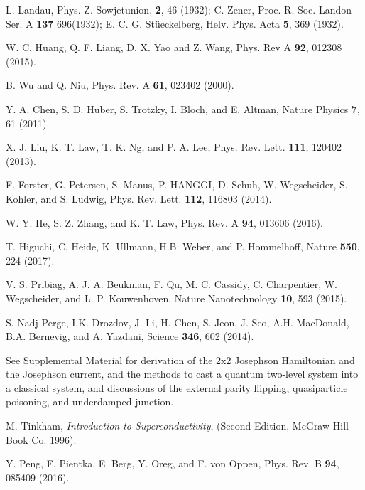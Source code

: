 \documentclass[aps,prl,twocolumn,showpacs,showpacs,10pt,superscriptaddress]{revtex4-1}
\begin{document}
\begin{thebibliography}{00}






 L. Landau, Phys. Z. Sowjetunion, \textbf{2}, 46 (1932); C. Zener, Proc. R. Soc. Landon Ser. A \textbf{137} 696(1932); E. C. G. St\"ueckelberg, Helv. Phys. Acta \textbf{5}, 369 (1932).


 W. C. Huang, Q. F. Liang, D. X. Yao and Z. Wang, Phys. Rev A \textbf{92}, 012308 (2015).

 B. Wu and Q. Niu, Phys. Rev. A \textbf{61}, 023402 (2000).

 Y. A. Chen, S. D. Huber, S. Trotzky, I. Bloch, and E. Altman, Nature Physics \textbf{7}, 61 (2011).

 X. J. Liu, K. T. Law, T. K. Ng, and P. A. Lee, Phys. Rev. Lett. \textbf{111}, 120402 (2013).

 F. Forster, G. Petersen, S. Manus, P. HANGGI, D. Schuh, W. Wegscheider, S. Kohler, and S. Ludwig, Phys. Rev. Lett. \textbf{112}, 116803 (2014).

 W. Y. He, S. Z. Zhang, and K. T. Law, Phys. Rev. A \textbf{94}, 013606 (2016).

 T. Higuchi, C. Heide, K. Ullmann, H.B. Weber, and P. Hommelhoff, Nature \textbf{550}, 224 (2017).

 V. S. Pribiag, A. J. A. Beukman, F. Qu, M. C. Cassidy, C. Charpentier, W. Wegscheider, and L. P. Kouwenhoven, Nature Nanotechnology \textbf{10}, 593 (2015).

 S. Nadj-Perge, I.K. Drozdov, J. Li, H. Chen, S. Jeon, J. Seo, A.H. MacDonald, B.A. Bernevig, and A. Yazdani, Science \textbf{346}, 602 (2014).

 See Supplemental Material for derivation of the 2x2 Josephson Hamiltonian and the Josephson current, and the methods to cast a quantum two-level system into a classical system, and discussions of the external parity flipping, quasiparticle poisoning, and underdamped junction.

  M. Tinkham, {\it Introduction to Superconductivity}, (Second Edition, McGraw-Hill Book Co. 1996).

 Y. Peng, F. Pientka, E. Berg, Y. Oreg, and F. von Oppen, Phys. Rev. B \textbf{94}, 085409 (2016).




\end{thebibliography}
\end{document}
